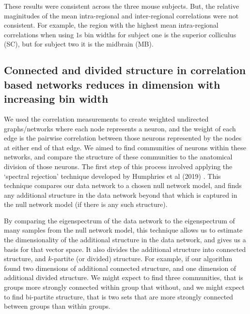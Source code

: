   These results were consistent across the three mouse subjects. But, the relative maginitudes of the mean intra-regional and inter-regional correlations were not consistent. For example, the region with the highest mean intra-regional correlations when using $1$s bin widths for subject one is the superior colliculus (SC), but for subject two it is the midbrain (MB).

  \subsection{Connected and divided structure in correlation based networks reduces in dimension with increasing bin width}\label{sec:dims_result}
  We used the correlation measurements to create weighted undirected graphs/networks where each node represents a neuron, and the weight of each edge is the pairwise correlation between those neurons represented by the nodes at either end of that edge. We aimed to find communities of neurons within these networks, and compare the structure of these communities to the anatomical division of those neurons. The first step of this process involved applying the `spectral rejection' technique developed by Humphries et al (2019) \parencite{humphries}. This technique compares our data network to a chosen null network model, and finds any additional structure in the data network beyond that which is captured in the null network model (if there is any such structure).

  By comparing the eigenspectrum of the data network to the eigenspectrum of many samples from the null network model, this technique allows us to estimate the dimensionality of the additional structure in the data network, and gives us a basis for that vector space. It also divides the additional structure into connected structure, and $k$-partite (or divided) structure. For example, if our algorithm found two dimensions of additional connected structure, and one dimension of additional divided structure. We might expect to find three communities, that is groups more strongly connected within group that without, and we might expect to find bi-partite structure, that is two sets that are more strongly connected between groups than within groups.

